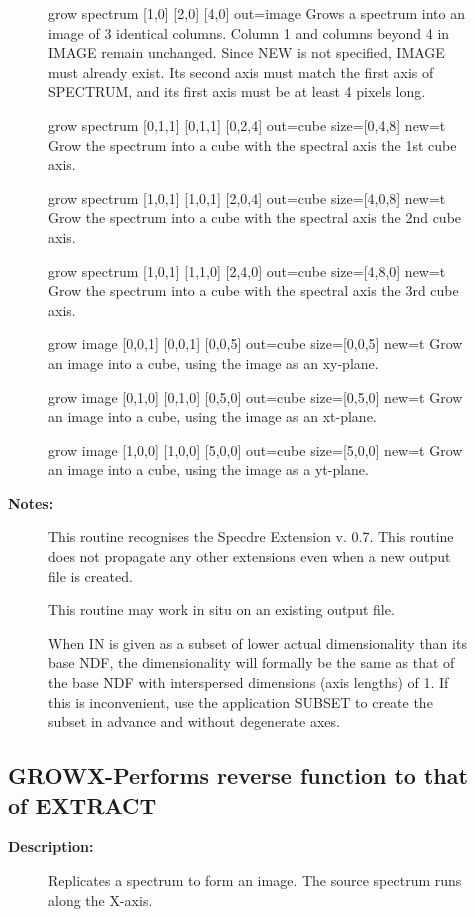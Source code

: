 \begin{description}
\begin{description}
\begin{terminalv}
grow spectrum [1,0] [2,0] [4,0] out=image
   Grows a spectrum into an image of 3 identical columns. Column 1
   and columns beyond 4 in IMAGE remain unchanged. Since NEW is
   not specified, IMAGE must already exist. Its second axis must
   match the first axis of SPECTRUM, and its first axis must be
   at least 4 pixels long.

grow spectrum [0,1,1] [0,1,1] [0,2,4] out=cube size=[0,4,8] new=t
   Grow the spectrum into a cube with the spectral axis the 1st
   cube axis.

grow spectrum [1,0,1] [1,0,1] [2,0,4] out=cube size=[4,0,8] new=t
   Grow the spectrum into a cube with the spectral axis the 2nd
   cube axis.

grow spectrum [1,0,1] [1,1,0] [2,4,0] out=cube size=[4,8,0] new=t
   Grow the spectrum into a cube with the spectral axis the 3rd
   cube axis.

grow image [0,0,1] [0,0,1] [0,0,5] out=cube size=[0,0,5] new=t
   Grow an image into a cube, using the image as an xy-plane.

grow image [0,1,0] [0,1,0] [0,5,0] out=cube size=[0,5,0] new=t
   Grow an image into a cube, using the image as an xt-plane.

grow image [1,0,0] [1,0,0] [5,0,0] out=cube size=[5,0,0] new=t
   Grow an image into a cube, using the image as a yt-plane.
\end{terminalv}

\item [\textbf{Notes:}]
This routine recognises the Specdre Extension v. 0.7. This
routine does not propagate any other extensions even when a new
output file is created.

This routine may work in situ on an existing output file.

When IN is given as a subset of lower actual dimensionality
than its base NDF, the dimensionality will formally be the same
as that of the base NDF with interspersed dimensions (axis
lengths) of 1. If this is inconvenient, use the application
SUBSET to create the subset in advance and without degenerate
axes.
\end{description}
\subsection{GROWX-\label{GROWX}Performs reverse function to that of EXTRACT}
\begin{description}

\item [\textbf{Description:}]
 Replicates a spectrum to form an image.  The source spectrum
 runs along the X-axis.


\end{description}
\end{description}
